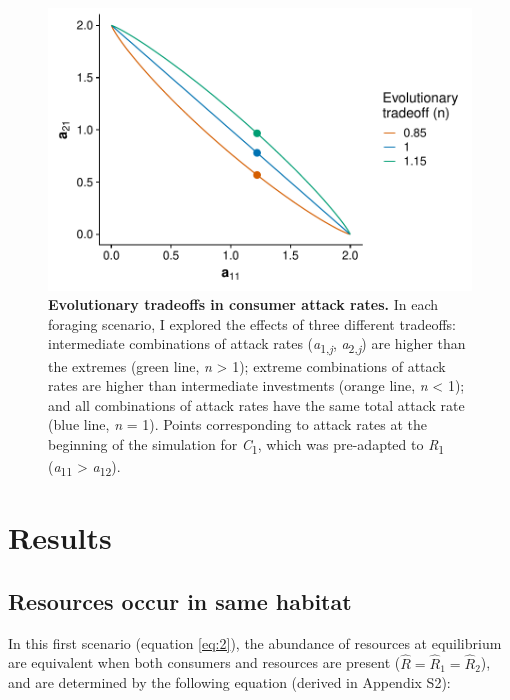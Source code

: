 \documentclass[11pt,]{article}
\begin{document}
\begin{figure}
\centering
\includegraphics{attack_tradeoffs.pdf}
\caption{\label{fig:tradeoff}\textbf{Evolutionary tradeoffs in consumer
attack rates.} In each foraging scenario, I explored the effects of
three different tradeoffs: intermediate combinations of attack rates
(\emph{a}\textsubscript{1,\emph{j}}, \emph{a}\textsubscript{2,\emph{j}})
are higher than the extremes (green line, \emph{n} \textgreater{} 1);
extreme combinations of attack rates are higher than intermediate
investments (orange line, \emph{n} \textless{} 1); and all combinations
of attack rates have the same total attack rate (blue line, \emph{n} =
1). Points corresponding to attack rates at the beginning of the
simulation for \emph{C}\textsubscript{1}, which was pre-adapted to
\emph{R}\textsubscript{1} (\emph{a}\textsubscript{11} \textgreater{}
\emph{a}\textsubscript{12}).}
\end{figure}

\section{Results}\label{results}

\subsection{Resources occur in same
habitat}\label{resources-occur-in-same-habitat}

In this first scenario (equation \ref{eq:2}), the abundance of resources
at equilibrium are equivalent when both consumers and resources are
present (\(\hat R = \hat R_1 = \hat R_2\)), and are determined by the
following equation (derived in Appendix S2):
\end{document}
